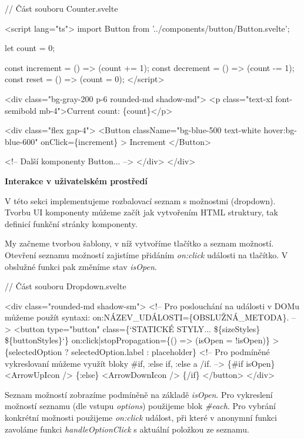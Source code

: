\begin{prog}
// Část souboru Counter.svelte

<script lang="ts">
  import Button from '../components/button/Button.svelte';

  let count = 0;

  const increment = () => (count += 1);
  const decrement = () => (count -= 1);
  const reset = () => (count = 0);
</script>

<div class="bg-gray-200 p-6 rounded-md shadow-md">
  <p class="text-xl font-semibold mb-4">Current count: \{count\}</p>

  <div class="flex gap-4">
    <Button 
      className="bg-blue-500 text-white hover:bg-blue-600" 
      onClick=\{increment\}
    >
      Increment
    </Button>

    <!-- Další komponenty Button... -->
  </div>
</div>
\end{prog}

\begin{flushleft}
  \textbf{Interakce v uživatelském prostředí}
\end{flushleft}

V této sekci implementujeme rozbalovací seznam s možnostmi (dropdown). Tvorbu UI komponenty můžeme začít jak vytvořením HTML struktury, tak definicí funkční stránky komponenty.

My začneme tvorbou šablony, v níž vytvoříme tlačítko a seznam možností. Otevření seznamu možností zajistíme přidáním \emph{on:click} události na tlačítko. V obslužné funkci pak změníme stav \emph{isOpen}.

\begin{prog}
// Část souboru Dropdown.svelte

<div class="rounded-md shadow-sm">
  <!-- Pro poslouchání na události v DOMu můžeme použít syntaxi: 
    on:NÁZEV_UDÁLOSTI=\{OBSLUŽNÁ_METODA\}. -->
  <button
    type="button"
    class=\{`STATICKÉ STYLY... \$\{sizeStyles\} \$\{buttonStyles\}`\}
    on:click|stopPropagation=\{() => (isOpen = !isOpen)\}
  >
    \{selectedOption ? selectedOption.label : placeholder\}
    <!-- Pro podmíněné vykreslovaní můžeme využít bloky
      #if, :else if, :else a /if. -->
    \{#if isOpen\}
      <ArrowUpIcon />
    \{:else\}
      <ArrowDownIcon />
    \{/if\}
  </button>
</div>
\end{prog}

Seznam možností zobrazíme podmíněně na základě \emph{isOpen}. Pro vykreslení možností seznamu (dle vstupu \emph{options}) použijeme blok \emph{\#each}. 
Pro vybrání konkrétní možnosti použijeme \emph{on:click} událost, při které v anonymní funkci zavoláme funkci \emph{handleOptionClick} s aktuální položkou ze seznamu.

